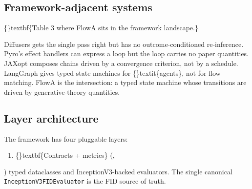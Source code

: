 \documentclass{article}
\begin{document}
\subsection{Framework-adjacent systems}
\{\}textbf\{Table 3  where FlowA sits in the framework landscape.\}

\begin{table}[ht]
\centering
\small
{}%
\end{table}

Diffusers gets the single pass right but has no outcome-conditioned re-inference. Pyro's effect handlers can express a loop but the loop carries no paper quantities. JAXopt composes chains driven by a convergence criterion, not by a schedule. LangGraph gives typed state machines for \{\}textit\{agents\}, not for flow matching. FlowA is the intersection: a typed state machine whose transitions are driven by generative-theory quantities.

\subsection{Layer architecture}
The framework has four pluggable layers:

\begin{enumerate}
\item \{\}textbf\{Contracts + metrics\} (,
\end{enumerate}
)  typed dataclasses and InceptionV3-backed evaluators. The single canonical \texttt{InceptionV3FIDEvaluator} is the FID source of truth.
\end{document}
